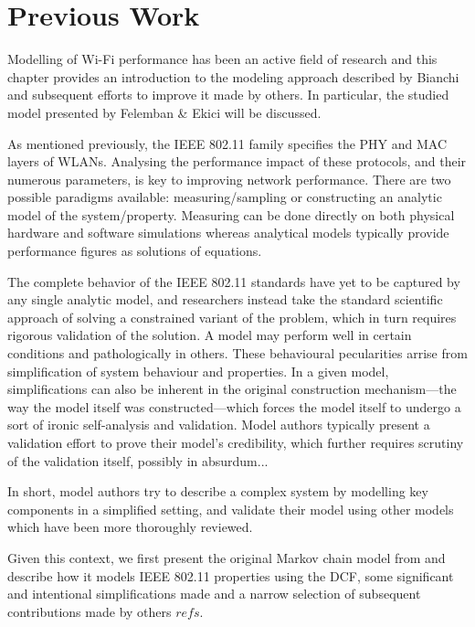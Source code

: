 
\chapter{Previous Work}

Modelling of Wi-Fi performance has been an active field of research and this
chapter provides an introduction to the modeling approach described by Bianchi
\cite{bianchi} and subsequent efforts to improve it made by others. In
particular, the studied model presented by Felemban \& Ekici \cite{felemban}
will be discussed.

As mentioned previously, the IEEE 802.11 family specifies the PHY and MAC
layers of WLANs. Analysing the performance impact of these protocols, and
their numerous parameters, is key to improving network performance. There are
two possible paradigms available: measuring/sampling or constructing an
analytic model of the system/property. Measuring can be done directly on both
physical hardware and software simulations whereas analytical models typically
provide performance figures as solutions of equations.

The complete behavior of the IEEE 802.11 standards have yet to be captured by
any single analytic model, and researchers instead take the standard
scientific approach of solving a constrained variant of the problem, which in
turn requires rigorous validation of the solution. A model may perform well in
certain conditions and pathologically in others. These behavioural
pecularities arrise from simplification of system behaviour and properties. In
a given model, simplifications can also be inherent in the original
construction mechanism—the way the model itself was constructed—which forces
the model itself to undergo a sort of ironic self-analysis and validation.
Model authors typically present a validation effort to prove their model's
credibility, which further requires scrutiny of the validation itself,
possibly in absurdum...

In short, model authors try to describe a complex system by modelling key
components in a simplified setting, and validate their model using other
models which have been more thoroughly reviewed.

Given this context, we first present the original Markov chain model from
\cite{bianchi} and describe how it models IEEE 802.11 properties using the
DCF, some significant and intentional simplifications made and a narrow
selection of subsequent contributions made by others $refs$. %

